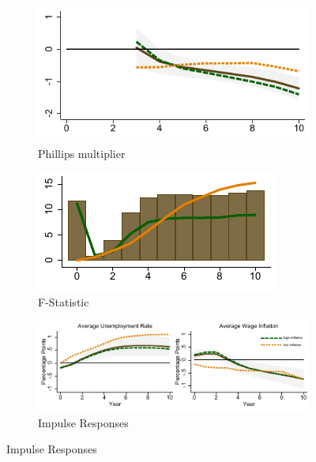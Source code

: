 \documentclass[12pt]{article}
\begin{document}
\begin{figure}[h!]
    \centering
	\caption{State-Dependent Phillips multiplier and IRFs}
	\label{F2:Multiplier}
	\begin{subfigure}[b]{0.45\textwidth}
		\caption{Phillips multiplier}
		\label{F2:Multiplier_M}
		\includegraphics[width=\textwidth]{../Output/Figures/fig_full_SDPMBM_LPIV10_2_asym_lowflat.pdf}	
	\end{subfigure}
	\begin{subfigure}[b]{0.45\textwidth}
		\caption{F-Statistic}
		\label{F2:Multiplier_F}
		\includegraphics[width=\textwidth]{../Output/Figures/fig_full_PMBM_F_LPIV10_2_asym_lowflat.pdf}
	\end{subfigure}
	\begin{subfigure}[b]{0.9\textwidth}
		\caption{Impulse Responses}
		\label{F2:Dynamics}
		\includegraphics[width=\textwidth]{../Output/Figures/fig_full_SDLPIVBM10_2_asym_lowflat.pdf}

\end{subfigure}
\end{figure}
\end{document}
